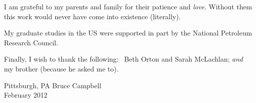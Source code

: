 

\def\baselinestretch{1.0}
 I am grateful to my parents and family for their
patience and {\em love}. Without them this work would never have come into
existence (literally).

My graduate studies in the US were supported in part by the National
Petroleum Research Council.

\medskip
Finally, I wish to thank the following: \,  Beth Orton and Sarah McLachlan;
{\em and } my brother (because he asked me to).

\bigskip\medskip

\noindent
Pittsburgh, PA \hfill Bruce Campbell\\
February 2012

